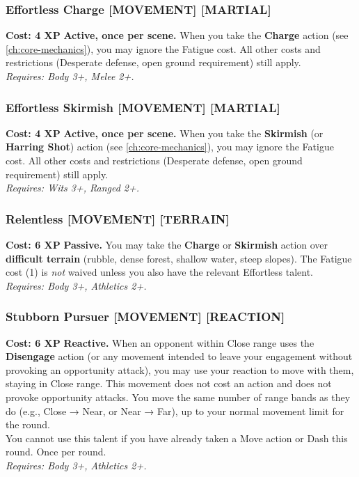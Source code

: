 \subsubsection*{Effortless Charge \textnormal{[MOVEMENT] [MARTIAL]}}
\label{talent:effortless-charge}
\textbf{Cost: 4 XP} \textbf{Active, once per scene.} When you take the \textbf{Charge} action (see \ref{ch:core-mechanics}), you may ignore the Fatigue cost. All other costs and restrictions (Desperate defense, open ground requirement) still apply. \\
\textit{Requires: Body 3+, Melee 2+.}

\subsubsection*{Effortless Skirmish \textnormal{[MOVEMENT] [MARTIAL]}}
\label{talent:effortless-skirmish}
\textbf{Cost: 4 XP} \textbf{Active, once per scene.} When you take the \textbf{Skirmish} (or \textbf{Harring Shot}) action (see \ref{ch:core-mechanics}), you may ignore the Fatigue cost. All other costs and restrictions (Desperate defense, open ground requirement) still apply. \\
\textit{Requires: Wits 3+, Ranged 2+.}

\subsubsection*{Relentless \textnormal{[MOVEMENT] [TERRAIN]}}
\label{talent:relentless}
\textbf{Cost: 6 XP} \textbf{Passive.} You may take the \textbf{Charge} or \textbf{Skirmish} action over \textbf{difficult terrain} (rubble, dense forest, shallow water, steep slopes). The Fatigue cost (1) is \emph{not} waived unless you also have the relevant Effortless talent. \\
\textit{Requires: Body 3+, Athletics 2+.}

\subsubsection*{Stubborn Pursuer \textnormal{[MOVEMENT] [REACTION]}}
\label{talent:stubborn-pursuer}
\textbf{Cost: 6 XP} \textbf{Reactive.} When an opponent within Close range uses the \textbf{Disengage} action (or any movement intended to leave your engagement without provoking an opportunity attack), you may use your reaction to move with them, staying in Close range. This movement does not cost an action and does not provoke opportunity attacks. You move the same number of range bands as they do (e.g., Close → Near, or Near → Far), up to your normal movement limit for the round. \\
You cannot use this talent if you have already taken a Move action or Dash this round. Once per round. \\
\textit{Requires: Body 3+, Athletics 2+.}

